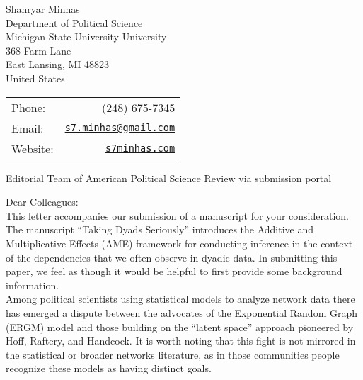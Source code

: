 \documentclass[letterpaper]{article}
\begin{document}
\thispagestyle{empty}

  
  
  \begin{minipage}{0.64\linewidth}
Shahryar Minhas \\
Department of Political Science \\
Michigan State University University \\
368 Farm Lane \\
East Lansing, MI 48823\\
United States
\end{minipage}
\begin{minipage}{0.45\linewidth}
  \begin{tabular}{lr}
    Phone: & (248) 675-7345 \\
    Email: & \href{mailto:s7.minhas@gmail.com}{\tt s7.minhas@gmail.com}  \\
    Website:& \href{http://s7minhas.com/}{\tt s7minhas.com}
  \end{tabular}
\end{minipage}
  
\vspace{1.5in}

{Editorial Team of American Political Science Review via submission portal}

\vspace{0.5in}

Dear Colleagues:\\[1ex]

This letter accompanies our submission of a manuscript for your consideration. The manuscript ``Taking Dyads Seriously'' introduces the Additive and Multiplicative Effects (AME) framework for conducting inference in the context of the dependencies that we often observe in dyadic data. In submitting this paper, we feel as though it would be helpful to first provide some background information. \\[1ex]

Among political scientists using statistical models to analyze network data there has emerged a dispute between the advocates of the Exponential Random Graph (ERGM) model and those building on the ``latent space'' approach pioneered by Hoff, Raftery, and Handcock. It is worth noting that this fight is not mirrored in the statistical or broader networks literature, as in those communities people recognize these models as having distinct goals.
\end{document}
